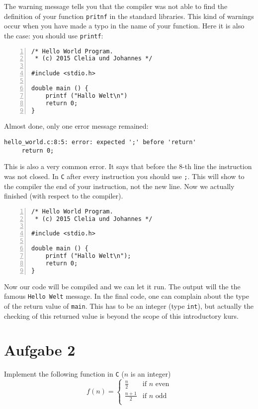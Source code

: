 \documentclass{article}[12pt]
\newenvironment{codelisting}{\fontfamily{pcr}\selectfont%
\lstset{commentstyle=\textit}\lstset{language=c}}{\fontfamily{ptm}\selectfont}
\begin{document}
The warning message tells you that the compiler was not able to find the definition of your function \texttt{pritnf}
in the standard libraries. This kind of warnings occur when you have made a typo in the name of your function. Here
it is also the case: you should use \texttt{printf}:
\begin{codelisting}
\begin{lstlisting}[numbers=left,numberstyle=\tiny,frame=tlrb,showstringspaces=false]
/* Hello World Program.
 * (c) 2015 Clelia und Johannes */

#include <stdio.h>

double main () {
    printf ("Hallo Welt\n")
    return 0;
}
\end{lstlisting}
\end{codelisting} 
Almost done, only one error message remained:
\begin{lstlisting}
hello_world.c:8:5: error: expected ';' before 'return'
     return 0;
\end{lstlisting}
This is also a very common error. It says that before the 8-th line the instruction was not closed. In \texttt{C}
after every instruction you should use \texttt{;}. This will show to the compiler the end of your instruction, not the
new line. Now we actually finished (with respect to the compiler).
\begin{codelisting}
\begin{lstlisting}[numbers=left,numberstyle=\tiny,frame=tlrb,showstringspaces=false]
/* Hello World Program.
 * (c) 2015 Clelia und Johannes */

#include <stdio.h>

double main () {
    printf ("Hallo Welt\n");
    return 0;
}
\end{lstlisting}
\end{codelisting}
Now our code will be compiled and we can let it run. The output will the the famous \texttt{Hello Welt} message.
In the final code, one can complain about the type of the return value of \texttt{main}. This has to be
an integer (type \texttt{int}), but actually the checking of this returned value is beyond the scope of
this introductory kurs.
\section{Aufgabe 2}
Implement the following function in \texttt{C} ($n$ is an integer)
\[
	f(n) = \left\{ \begin{array}{ll}
	\frac{n}{2} & \text{if } n \text{ even} \\
	\frac{n+1}{2} & \text{if } n \text{ odd} \\
	\end{array}
	\right.
\]
\end{document}
